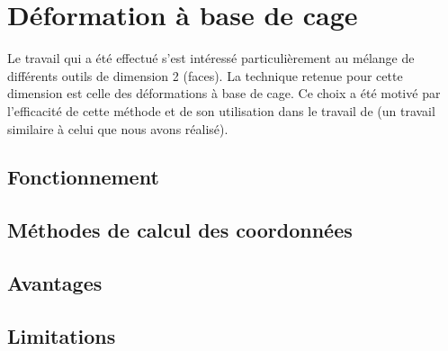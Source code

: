 

\chapter{Déformation à base de cage}

\graphicspath{ {Chapter2/Chapter2Figs/PNG/}
  {Chapter2/Chapter2Figs/PDF/} {Chapter2/Chapter2Figs/} }

Le travail qui a été effectué s'est intéressé particulièrement au mélange de
différents outils de dimension 2 (faces). La technique retenue pour cette
dimension est celle des déformations à base de cage. Ce choix a été motivé par
l'efficacité de cette méthode et de son utilisation dans le travail de
\cite{GPCP13} (un travail similaire à celui que nous avons réalisé).

\section{Fonctionnement} 

\section{Méthodes de calcul des coordonnées} 

\section{Avantages}

\section{Limitations}